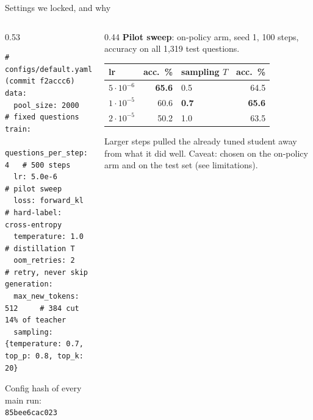 \begin{frame}[fragile]{Settings we locked, and why\hfill\ours\ }
  \begin{columns}[T]
    \begin{column}{0.53\textwidth}
\begin{lstlisting}[style=kdplain]
# configs/default.yaml  (commit f2accc6)
data:
  pool_size: 2000         # fixed questions
train:
  questions_per_step: 4   # 500 steps
  lr: 5.0e-6              # pilot sweep
  loss: forward_kl        # hard-label: cross-entropy
  temperature: 1.0        # distillation T
  oom_retries: 2          # retry, never skip
generation:
  max_new_tokens: 512     # 384 cut 14% of teacher
  sampling: {temperature: 0.7, top_p: 0.8, top_k: 20}
\end{lstlisting}
      {\tiny\color{kdgray} Config hash of every main run: \texttt{85bee6cac023}}
    \end{column}
    \begin{column}{0.44\textwidth}
      \footnotesize
      \textbf{Pilot sweep}: on-policy arm, seed 1, 100 steps, accuracy
      on all 1,319 test questions.
      \vspace{0.1cm}

      \centering
      \begin{tabular}{@{}lr@{\qquad}lr@{}}
        \toprule
        lr & acc.\ \% & sampling $T$ & acc.\ \% \\
        \midrule
        $5\cdot10^{-6}$ & \textbf{65.6} & 0.5 & 64.5 \\
        $1\cdot10^{-5}$ & 60.6 & \textbf{0.7} & \textbf{65.6} \\
        $2\cdot10^{-5}$ & 50.2 & 1.0 & 63.5 \\
        \bottomrule
      \end{tabular}

      \raggedright
      \vspace{0.15cm}
      Larger steps pulled the already tuned student away from what it did
      well. Caveat: chosen on the on-policy arm and on the test set
      (see limitations).
    \end{column}
  \end{columns}
\end{frame}

